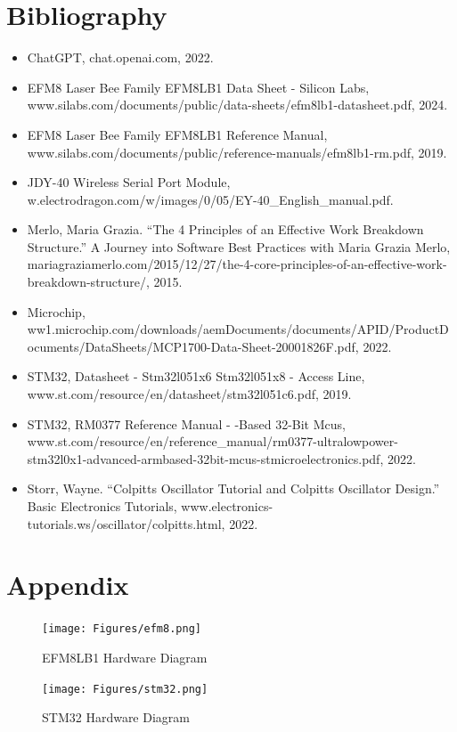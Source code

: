 \documentclass{article}
\begin{document}
\section{Bibliography}
\begin{itemize}
    \item ChatGPT, chat.openai.com, 2022.
    \item EFM8 Laser Bee Family EFM8LB1 Data Sheet - Silicon Labs, www.silabs.com/documents/public/data-sheets/efm8lb1-datasheet.pdf, 2024.
    \item EFM8 Laser Bee Family EFM8LB1 Reference Manual, www.silabs.com/documents/public/reference-manuals/efm8lb1-rm.pdf, 2019.
    \item JDY-40 Wireless Serial Port Module, w.electrodragon.com/w/images/0/05/EY-40\_English\_manual.pdf.
    \item Merlo, Maria Grazia. “The 4 Principles of an Effective Work Breakdown Structure.” A Journey into Software Best Practices with Maria Grazia Merlo, mariagraziamerlo.com/2015/12/27/the-4-core-principles-of-an-effective-work-breakdown-structure/, 2015.
    \item Microchip, ww1.microchip.com/downloads/aemDocuments/documents/APID/ProductDocuments/DataSheets/MCP1700-Data-Sheet-20001826F.pdf, 2022.
    \item STM32, Datasheet - Stm32l051x6 Stm32l051x8 - Access Line, www.st.com/resource/en/datasheet/stm32l051c6.pdf, 2019.
    \item STM32, RM0377 Reference Manual - -Based 32-Bit Mcus, www.st.com/resource/en/reference\_manual/rm0377-ultralowpower-stm32l0x1-advanced-armbased-32bit-mcus-stmicroelectronics.pdf, 2022.
    \item Storr, Wayne. “Colpitts Oscillator Tutorial and Colpitts Oscillator Design.” Basic Electronics Tutorials, www.electronics-tutorials.ws/oscillator/colpitts.html, 2022.
\end{itemize}

\clearpage
\section{Appendix}

\begin{figure}[htbp]
    \centering
    \texttt{[image: Figures/efm8.png]}
    \caption{EFM8LB1 Hardware Diagram}
    \label{fig:efm8}
\end{figure}

\begin{figure}[htbp]
    \centering
    \texttt{[image: Figures/stm32.png]}
    \caption{STM32 Hardware Diagram}
    \label{fig:stm32}
\end{figure}
\end{document}
